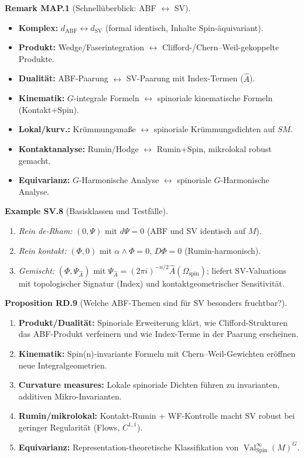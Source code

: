 \documentclass[10pt, letterpaper]{article}
\newcommand{\Spin}{\mathrm{Spin}}
\newcommand{\CustomHeading}[3]{%
  \par\medskip\noindent%
  \textbf{#1 #2} \textnormal{(#3)}.\enskip%
}
\newenvironment{PROP}[2]{\begin{unitbox}\CustomHeading{Proposition}{#1}{#2}}{\end{unitbox}}
\newenvironment{REM}[2]{\begin{unitbox}\CustomHeading{Remark}{#1}{#2}}{\end{unitbox}}
\newenvironment{EXA}[2]{\begin{unitbox}\CustomHeading{Example}{#1}{#2}}{\end{unitbox}}
\begin{document}
\begin{REM}{MAP.1}{Schnellüberblick: ABF $\longleftrightarrow$ SV}
\begin{itemize}
\item \textbf{Komplex:} $d_{\mathrm{ABF}} \leftrightarrow d_{\mathrm{SV}}$ (formal identisch, Inhalte Spin-äquivariant).
\item \textbf{Produkt:} Wedge/Faserintegration $\leftrightarrow$ Clifford-/Chern–Weil-gekoppelte Produkte.
\item \textbf{Dualität:} ABF-Paarung $\leftrightarrow$ SV-Paarung mit Index-Termen ($\widehat A$).
\item \textbf{Kinematik:} $G$-integrale Formeln $\leftrightarrow$ spinoriale kinematische Formeln (Kontakt+Spin).
\item \textbf{Lokal/kurv.:} Krümmungsmaße $\leftrightarrow$ spinoriale Krümmungsdichten auf $SM$.
\item \textbf{Kontaktanalyse:} Rumin/Hodge $\leftrightarrow$ Rumin+Spin, mikrolokal robust gemacht.
\item \textbf{Equivarianz:} $G$-Harmonische Analyse $\leftrightarrow$ spinoriale $G$-Harmonische Analyse.
\end{itemize}
\end{REM}


\begin{EXA}{SV.8}{Basisklassen und Testfälle}
\begin{enumerate}[label=(\alph*)]
\item \emph{Rein de-Rham:} $(0,\Psi)$ mit $d\Psi=0$ (ABF und SV identisch auf $M$).
\item \emph{Rein kontakt:} $(\Phi,0)$ mit $\alpha\!\wedge\!\Phi=0$, $D\Phi=0$ (Rumin-harmonisch).
\item \emph{Gemischt:} $(\Phi,\Psi_{\widehat A})$ mit $\Psi_{\widehat A}=(2\pi i)^{-n/2}\widehat A(\Omega_{\mathrm{spin}})$;
liefert SV-Valuations mit topologischer Signatur (Index) und kontaktgeometrischer Sensitivität.
\end{enumerate}
\end{EXA}


\begin{PROP}{RD.9}{Welche ABF-Themen sind für SV besonders fruchtbar?}
\begin{enumerate}[label=\roman*)]
\item \textbf{Produkt/Dualität:} Spinoriale Erweiterung klärt, wie Clifford-Strukturen das ABF-Produkt verfeinern und
wie Index-Terme in der Paarung erscheinen.
\item \textbf{Kinematik:} Spin(n)-invariante Formeln mit Chern–Weil-Gewichten eröffnen neue Integralgeometrien.
\item \textbf{Curvature measures:} Lokale spinoriale Dichten führen zu invarianten, additiven Mikro-Invarianten.
\item \textbf{Rumin/mikrolokal:} Kontakt-Rumin + WF-Kontrolle macht SV robust bei geringer Regularität (Flows, $C^{1,1}$).
\item \textbf{Equivarianz:} Representation-theoretische Klassifikation von $\operatorname{Val}^\infty_{\Spin}(M)^G$.
\end{enumerate}
\end{PROP}
\end{document}
